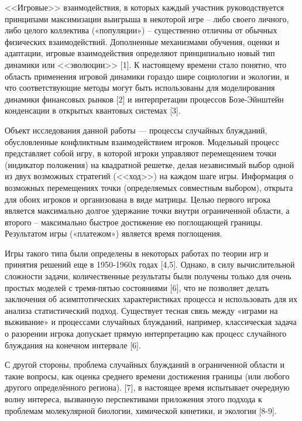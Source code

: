 
{\actuality} <<Игровые>> взаимодействия, в которых каждый участник руководствуется принципами максимизации выигрыша в некоторой игре -- 
либо своего личного, либо целого коллектива («популяции») – существенно отличны от обычных физических взаимодействий. 
Дополненные механизмами обучения, оценки и адаптации, игровые взаимодействия определяют принципиально новый тип динамики или <<эволюции>> [1]. 
К настоящему времени стало понятно, что область применения игровой динамики гораздо шире социологии и экологии, и что соответствующие 
методы могут быть использованы для моделирования динамики финансовых рынков [2] и интерпретации процессов Бозе-Эйнштейн конденсации в открытых квантовых системах [3]. 

Объект исследования данной работы — процессы случайных блужданий, обусловленные конфликтным взаимодействием игроков. 
Модельный процесс представляет собой игру, в которой игроки управляют перемещением точки (индикатор положения) на квадратной решетке, 
делая независимый выбор одной из двух возможных стратегий (<<ход>>) на каждом шаге игры. Информация о возможных перемещениях точки 
(определяемых совместным выбором), открыта для обоих игроков и организована в виде матрицы. Целью первого игрока является максимально 
долгое удержание точки внутри ограниченной области, а второго -- максимально быстрое достижение ею поглощающей границы. 
Результатом игры («платежом») является время поглощения. 

Игры такого типа были определены в некоторых работах по теории игр и принятия решений еще в 1950-1960х годах [4,5]. 
Однако, в силу вычислительной сложности задачи, количественные результаты были получены только для очень простых моделей 
с тремя-пятью состояниями [6], что не позволяет делать заключения об асимптотических характеристиках процесса и использовать 
для их анализа статистический подход. Существует тесная связь между «играми на выживание» и процессами случайных блужданий, 
например, классическая задача о разорении игрока допускает прямую интерпретацию как процесс случайного блуждания на конечном интервале [6]. 

С другой стороны, проблема случайных блужданий в ограниченной области и такие вопросы, как оценка среднего времени достижения границы 
(или любого другого определённого региона). [7], в настоящее время испытывает очередную волну интереса, вызванную перспективами 
приложения этого подхода к проблемам молекулярной биологии, химической кинетики, и экологии [8-9]. 

